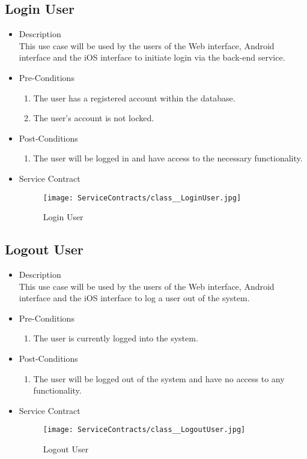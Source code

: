 \documentclass[11pt,fleqn]{book} %
\begin{document}
\subsection{Login User}
\begin{itemize}
	\item Description\\
	This use case will be used by the users of the Web interface, Android interface and the iOS interface to initiate login via the back-end service.
	\item Pre-Conditions
	\begin{enumerate}
		\item The user has a registered account within the database.
		\item The user’s account is not locked.
	\end{enumerate}
	\item Post-Conditions
	\begin{enumerate}
		\item The user will be logged in and have access to the necessary functionality.
	\end{enumerate}
	\item Service Contract
	\begin{figure}
		\texttt{[image: ServiceContracts/class\_\_LoginUser.jpg]}
		\caption{Login User}
	\end{figure}
\end{itemize}

\subsection{Logout User}
\begin{itemize}
	\item Description\\
	This use case will be used by the users of the Web interface, Android interface and the iOS interface to log a user out of the system.
	\item Pre-Conditions
	\begin{enumerate}
		\item The user is currently logged into the system.
	\end{enumerate}
	\item Post-Conditions
	\begin{enumerate}
		\item The user will be logged out of the system and have no access to any functionality.
	\end{enumerate}
	\item Service Contract
	\begin{figure}
		\texttt{[image: ServiceContracts/class\_\_LogoutUser.jpg]}
		\caption{Logout User}
	\end{figure}
\end{itemize}
\end{document}
